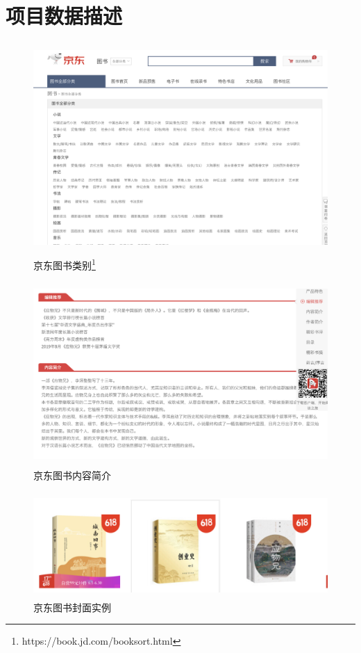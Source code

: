 \section{项目数据描述}

\begin{figure}[ht]
 \centering
 \includegraphics[height=8cm]{images/jd_book.jpg}
 \caption{京东图书类别\footnote{https://book.jd.com/booksort.html}}
 \label{fig:jd_book}
\end{figure}

\begin{figure}[ht]
 \centering
 \includegraphics[height=7cm]{images/jd_book_text.jpg}
 \caption{京东图书内容简介}
 \label{fig:jd_book_text}
\end{figure}

\begin{figure}[ht]
 \centering
 \includegraphics[height=4cm]{images/jd_book_cover.jpg}
 \caption{京东图书封面实例}
 \label{fig:jd_book_cover}
\end{figure}

